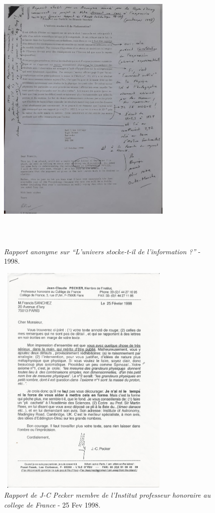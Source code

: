 \documentclass[a4paper,12pt]{article}
\begin{document}
\begin{appendix}
\begin{figure}
\centering
\includegraphics[width=8.5cm,height=14.5cm]{./figures/rapportAnonyme.jpg}
\caption[Rapport Anonyme demandé par le doyen de l'universite d'Orsay]{\textit{Rapport anonyme sur ``L'univers stocke-t-il de l'information ?''} -  1998.} 
\label{fig:16:figure16}
\end{figure}

\begin{figure}
\centering
\includegraphics[width=8.5cm,height=11.5cm]{./figures/Pecker98.jpg}
\caption[Rapport de JC Pecker évaluant le travail en cosmologie de Francis M. Sanchez]{\textit{Rapport de J-C Pecker membre de l'Institut professeur honoraire au college de France} - 25 Fev 1998.} 
\label{fig:17:figure17}
\end{figure}



\end{appendix}
\end{document}
